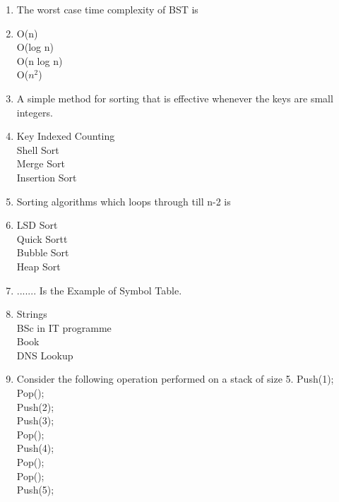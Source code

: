 \documentclass[12pt ,a4paper]{exam}
\begin{document}
\begin{enumerate}[start=1,label={\bfseries Q\arabic*)}]
 	   	\item The worst case time complexity of BST is
 	    \item[] 
 	    \begin{oneparchoices}
 	    	\choice  O(n)\\%
 	    	\choice  O(log n)\\
 	    	\choice O(n log n)\\
 	    	\choice O($n^2$)
 	    \end{oneparchoices}
 		\item A simple method for sorting that is effective whenever the keys are small integers.
     	\item[]   
     	 \begin{oneparchoices}
     		\choice  Key Indexed Counting\\%
     		\choice  Shell Sort\\
     		\choice Merge Sort\\
     		\choice Insertion Sort
     	\end{oneparchoices}
     
     \item Sorting algorithms which loops through till n-2 is
     \item[]   
     \begin{oneparchoices}
     	\choice  LSD Sort\\%
     	\choice  Quick Sortt\\
     	\choice Bubble Sort\\
     	\choice Heap Sort
     \end{oneparchoices}
 
    \item ....... Is the Example of Symbol Table.
    \item[]   
    \begin{oneparchoices}
    	\choice  Strings\\%
    	\choice  BSc in IT programme\\
    	\choice Book\\
    	\choice DNS Lookup
    \end{oneparchoices}
    
    \item Consider the following operation performed on a stack of size 5.
    Push(1);\\
    Pop();\\
    Push(2);\\
    Push(3);\\
    Pop();\\
    Push(4);\\
    Pop();\\
    Pop();\\
    Push(5);\\
    

\end{enumerate}
\end{document}
